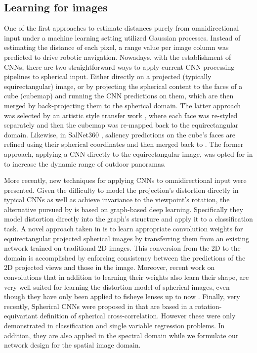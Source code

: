 \subsection{Learning for  images}
\label{sec:360learning}
One of the first approaches to estimate distances purely from omnidirectional input \cite{plagemann2010nonparametric} under a machine learning setting utilized Gaussian processes. Instead of estimating the distance of each pixel, a range value per image column was predicted to  drive robotic navigation. Nowadays, with the establishment of CNNs, there are two straightforward ways to apply current CNN processing pipelines to spherical input. Either directly on a projected (typically equirectangular) image, or by projecting the spherical content to the faces of a cube (cubemap) and running the CNN predictions on them, which are then merged by back-projecting them to the spherical domain. The latter approach was selected by an artistic style transfer work \cite{ruder2017artistic}, where each face was re-styled separately and then the cubemap was re-mapped back to the equirectangular domain. Likewise, in SalNet360 \cite{monroy2017salnet360}, saliency predictions on the cube's faces are refined using their spherical coordinates and then merged back to . The former approach, applying a CNN directly to the equirectangular image, was opted for in \cite{zhang2017learning} to increase the dynamic range of outdoor panoramas.

More recently, new techniques for applying CNNs to omnidirectional input were presented. Given the difficulty to model the projection's distortion directly in typical CNNs as well as achieve invariance to the viewpoint's rotation, the alternative pursued by \cite{frossard2017graph} is based on graph-based deep learning. Specifically they model distortion directly into the graph's structure and apply it to a classification task. A novel approach taken in \cite{su2017learning} is to learn appropriate convolution weights for equirectangular projected spherical images by transferring them from an existing network trained on traditional 2D images. This conversion from the 2D to the  domain is accomplished by enforcing consistency between the predictions of the 2D projected views and those in the  image. Moreover, recent work on convolutions \cite{jeon2017active,dai2017deformable} that in addition to learning their weights also learn their shape, are very well suited for learning the distortion model of spherical images, even though they have only been applied to fisheye lenses up to now \cite{deng2018restricted}. Finally, very recently, Spherical CNNs were proposed in \cite{cohen2017convolutional,cohen2018spherical} that are based in a rotation-equivariant definition of spherical cross-correlation. However these were only demonstrated in classification and single variable regression problems. In addition, they are also applied in the spectral domain while we formulate our network design for the spatial image domain.
   
